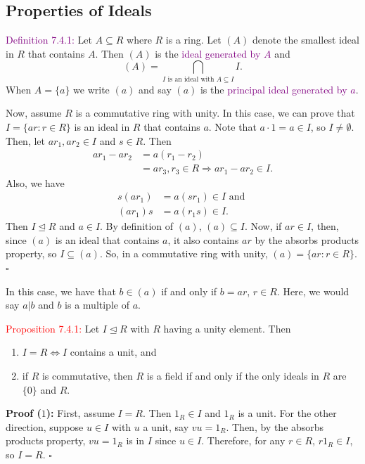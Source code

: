 \documentclass{article}
\begin{document}
\subsection{Properties of Ideals}

\textcolor{purple}{Definition 7.4.1:} Let $A \subseteq R$ where $R$ is a ring. Let $(A)$ denote the smallest ideal in $R$ that contains 
$A$. Then $(A)$ is the \textcolor{purple}{ideal generated by $A$} and 
\[
    (A) = \bigcap_{I \text{ is an ideal with } A \subseteq I}{I}.
\]
When $A = \{a\}$ we write $(a)$ and say $(a)$ is the \textcolor{purple}{principal ideal generated by $a$}.

Now, assume $R$ is a commutative ring with unity. In this case, we can prove that $I = \{ar: r \in R\}$ is an ideal in $R$ that contains 
$a$. Note that $a \cdot 1 = a \in I$, so $I \neq \emptyset$. Then, let $ar_1, ar_2 \in I$ and $s \in R$. Then 
\begin{align*}
    ar_1-ar_2 &= a(r_1-r_2) \\
    &= ar_3, r_3 \in R \Longrightarrow ar_1-ar_2 \in I. 
\end{align*}
Also, we have
\begin{align*}
    s(ar_1) &= a(sr_1) \in I \text{ and }\\
    (ar_1)s &= a(r_1s) \in I.   
\end{align*}
Then $I \trianglelefteq R$ and $a \in I$. By definition of $(a)$, $(a) \subseteq I$. Now, if $ar \in I$, then, since $(a)$ is an ideal 
that contains $a$, it also contains $ar$ by the absorbs products property, so $I \subseteq (a)$. So, in a commutative ring with unity, 
$(a) = \{ar: r \in R\}$. $\square$

In this case, we have that $b \in (a)$ if and only if $b=ar$, $r \in R$. Here, we would say $a | b$ and $b$ is a multiple of $a$.

\textcolor{red}{Proposition 7.4.1:} Let $I \trianglelefteq R$ with $R$ having a unity element. Then
\begin{enumerate}
    \item $I = R \Longleftrightarrow I$ contains a unit, and 
    \item if $R$ is commutative, then $R$ is a field if and only if the only ideals in $R$ are $\{0\}$ and $R$.
\end{enumerate}

\textbf{Proof ($1$):} First, assume $I = R$. Then $1_R \in I$ and $1_R$ is a unit. For the other direction, suppose $u \in I$ with $u$ a 
unit, say $vu = 1_R$. Then, by the absorbs products property, $vu = 1_R$ is in $I$ since $u \in I$. Therefore, for any $r \in R$, $r1_R \in I$, 
so $I = R$. $\square$
\end{document}
